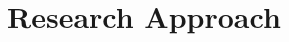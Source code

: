 \documentclass[final_report_innit.tex]{subfiles}
\begin{document}
\section{Research Approach}
\end{document}
